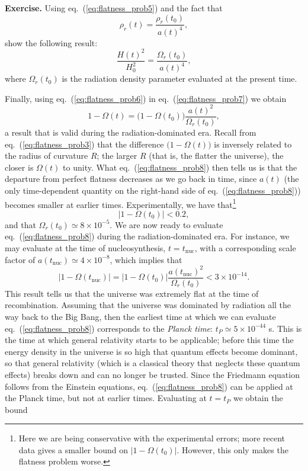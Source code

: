 \documentclass[11pt, a4paper,oneside,openright]{book}
\numberwithin{equation}{section}
\begin{document}
{\bf Exercise.} Using eq.\ (\ref{eq:flatness_prob5}) and the fact that
\begin{equation}
\rho_r(t)=\frac{\rho_r(t_0)}{a(t)^4},
\end{equation}
show the following result:
\begin{equation} \label{eq:flatness_prob6}
\frac{H(t)^2}{H_0^2}=\frac{\Omega_r(t_0)}{a(t)^4},
\end{equation}
where $\Omega_r(t_0)$ is the radiation density parameter evaluated at the present time.

\par\vspace{\baselineskip}

Finally, using eq.\ (\ref{eq:flatness_prob6}) in eq.\ (\ref{eq:flatness_prob7}) we obtain
\begin{equation} \label{eq:flatness_prob8}
1-\Omega(t)=\big(1-\Omega(t_0)\big)\frac{a(t)^2}{\Omega_r(t_0)},
\end{equation}
a result that is valid during the radiation-dominated era. Recall from eq.\ (\ref{eq:flatness_prob3}) that the difference $\big(1-\Omega(t)\big)$ is inversely related to the radius of curvature $R$; the larger $R$ (that is, the flatter the universe), the closer is $\Omega(t)$ to unity. What eq.\ (\ref{eq:flatness_prob8}) then tells us is that the departure from perfect flatness decreases as we go back in time, since $a(t)$ (the only time-dependent quantity on the right-hand side of eq.\ (\ref{eq:flatness_prob8})) becomes smaller at earlier times. Experimentally, we have that\footnote{Here we are being conservative with the experimental errors; more recent data gives a smaller bound on $|1-\Omega(t_0)|$. However, this only makes the flatness problem worse.}
\begin{equation}
|1-\Omega(t_0)|<0.2,
\end{equation}
and that $\Omega_r(t_0)\simeq8\times10^{-5}$. We are now ready to evaluate eq.\ (\ref{eq:flatness_prob8}) during the radiation-dominated era. For instance, we may evaluate at the time of nucleosynthesis, $t=t_{\mathrm{nuc}}$, with a corresponding scale factor of $a(t_{\mathrm{nuc}})\simeq 4\times10^{-8}$, which implies that
\begin{equation} \label{eq:flatness_nucleosynthesis}
|1-\Omega(t_{\mathrm{nuc}})|=|1-\Omega(t_0)|\frac{a(t_{\mathrm{nuc}})^2}{\Omega_r(t_0)}<3\times10^{-14}.
\end{equation}
This result tells us that the universe was extremely flat at the time of recombination. Assuming that the universe was dominated by radiation all the way back to the Big Bang, then the earliest time at which we can evaluate eq.\ (\ref{eq:flatness_prob8}) corresponds to the {\it Planck time}: $t_P\simeq5\times10^{-44}$ s. This is the time at which general relativity starts to be applicable; before this time the energy density in the universe is so high that quantum effects become dominant, so that general relativity (which is a classical theory that neglects these quantum effects) breaks down and can no longer be trusted. Since the Friedmann equation follows from the Einstein equations, eq.\ (\ref{eq:flatness_prob8}) can be applied at the Planck time, but not at earlier times. Evaluating at $t=t_P$ we obtain the bound
\end{document}
